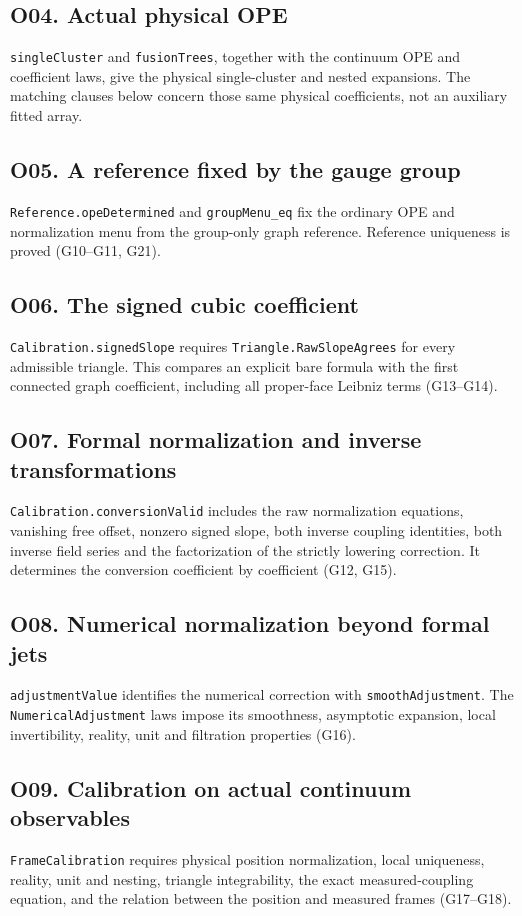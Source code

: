 \documentclass[11pt]{article}
\newcommand{\code}[1]{{\small\nolinkurl{#1}}}
\begin{document}
\subsection*{O04. Actual physical OPE}
\code{singleCluster} and \code{fusionTrees}, together with the
continuum OPE and coefficient laws, give the physical single-cluster
and nested expansions. The matching clauses below concern those
same physical coefficients, not an auxiliary fitted array.

\subsection*{O05. A reference fixed by the gauge group}
\code{Reference.opeDetermined} and \code{groupMenu_eq}
fix the ordinary OPE and normalization menu from the group-only
graph reference. Reference uniqueness is proved (G10--G11, G21).

\subsection*{O06. The signed cubic coefficient}
\code{Calibration.signedSlope} requires
\code{Triangle.RawSlopeAgrees} for every admissible triangle.
This compares an explicit bare formula with the first connected
graph coefficient, including all proper-face Leibniz terms (G13--G14).

\subsection*{O07. Formal normalization and inverse transformations}
\code{Calibration.conversionValid} includes the raw normalization
equations, vanishing free offset, nonzero signed slope, both inverse
coupling identities, both inverse field series and the factorization
of the strictly lowering correction. It determines the conversion
coefficient by coefficient (G12, G15).

\subsection*{O08. Numerical normalization beyond formal jets}
\code{adjustmentValue} identifies the numerical correction with
\code{smoothAdjustment}. The \code{NumericalAdjustment} laws impose
its smoothness, asymptotic expansion, local invertibility, reality,
unit and filtration properties (G16).

\subsection*{O09. Calibration on actual continuum observables}
\code{FrameCalibration} requires physical position normalization,
local uniqueness, reality, unit and nesting, triangle integrability,
the exact measured-coupling equation, and the relation between the
position and measured frames (G17--G18).
\end{document}
